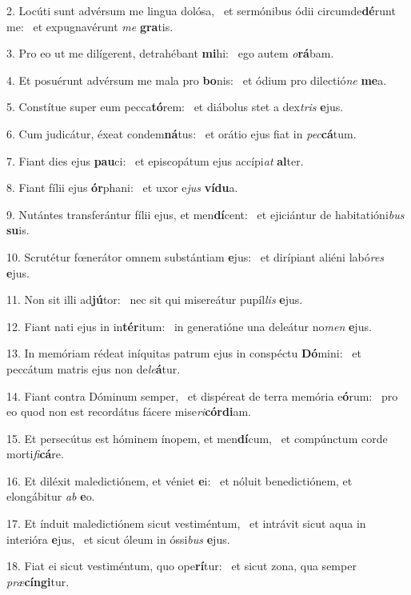 2. Locúti sunt advérsum me lingua dolósa, \dag\  et sermónibus ódii circumde\textbf{dé}runt me: \ast\  et expugnavérunt \textit{me} \textbf{gra}tis.\

3. Pro eo ut me dilígerent, detrahébant \textbf{mi}hi: \ast\  ego autem \textit{o}\textbf{rá}bam.\

4. Et posuérunt advérsum me mala pro \textbf{bo}nis: \ast\  et ódium pro dilectió\textit{ne} \textbf{me}a.\

5. Constítue super eum pecca\textbf{tó}rem: \ast\  et diábolus stet a dex\textit{tris} \textbf{e}jus.\

6. Cum judicátur, éxeat condem\textbf{ná}tus: \ast\  et orátio ejus fiat in \textit{pec}\textbf{cá}tum.\

7. Fiant dies ejus \textbf{pau}ci: \ast\  et episcopátum ejus accípi\textit{at} \textbf{al}ter.\

8. Fiant fílii ejus \textbf{ór}phani: \ast\  et uxor e\textit{jus} \textbf{ví}\textbf{du}a.\

9. Nutántes transferántur fílii ejus, et men\textbf{dí}cent: \ast\  et ejiciántur de habitatióni\textit{bus} \textbf{su}is.\

10. Scrutétur fœnerátor omnem substántiam \textbf{e}jus: \ast\  et dirípiant aliéni labó\textit{res} \textbf{e}jus.\

11. Non sit illi ad\textbf{jú}tor: \ast\  nec sit qui misereátur pupíl\textit{lis} \textbf{e}jus.\

12. Fiant nati ejus in in\textbf{tér}itum: \ast\  in generatióne una deleátur no\textit{men} \textbf{e}jus.\

13. In memóriam rédeat iníquitas patrum ejus in conspéctu \textbf{Dó}mini: \ast\  et peccátum matris ejus non de\textit{le}\textbf{á}tur.\

14. Fiant contra Dóminum semper, \dag\  et dispéreat de terra memória e\textbf{ó}rum: \ast\  pro eo quod non est recordátus fácere mise\textit{ri}\textbf{cór}\textbf{di}am.\

15. Et persecútus est hóminem ínopem, et men\textbf{dí}cum, \ast\  et compúnctum corde morti\textit{fi}\textbf{cá}re.\

16. Et diléxit maledictiónem, et véniet \textbf{e}i: \ast\  et nóluit benedictiónem, et elongábitur \textit{ab} \textbf{e}o.\

17. Et índuit maledictiónem sicut vestiméntum, \dag\  et intrávit sicut aqua in interióra \textbf{e}jus, \ast\  et sicut óleum in óssi\textit{bus} \textbf{e}jus.\

18. Fiat ei sicut vestiméntum, quo ope\textbf{rí}tur: \ast\  et sicut zona, qua semper \textit{præ}\textbf{cín}\textbf{gi}tur.\

